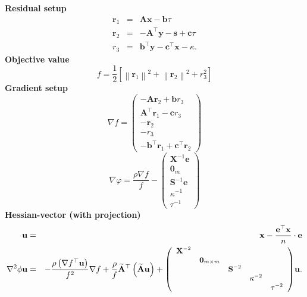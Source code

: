 \documentclass{article}
\newcommand{\cdummy}{\cdot}
\newcommand{\tmstrong}[1]{\textbf{#1}}
\newcommand{\x}{\mathbf{x}}
\newcommand{\A}{\mathbf{A}}
\newcommand{\0}{\textbf{0}}
\newcommand{\e}{\mathbf{e}}
\newcommand{\n}{\nabla}
\newcommand{\X}{\mathbf{X}}
\newcommand{\tmb}{\mathbf{b}}
\newcommand{\tmc}{\mathbf{c}}
\newcommand{\y}{\mathbf{y}}
\newcommand{\s}{\mathbf{s}}
\newcommand{\tmu}{\mathbf{u}}
\newcommand{\bs}{\mathbf{S}}
\newcommand{\tmr}{\mathbf{r}}
\begin{document}
{\tmstrong{Residual setup}}
\begin{eqnarray*}
  \tmr_1 & = & \A \x - \tmb \tau\\
  \tmr_2 & = & - \A^{\top} \y - \s + \tmc \tau\\
  r_3 & = & \tmb^{\top} \y - \tmc^{\top} \x - \kappa .
\end{eqnarray*}
{\tmstrong{Objective value}}
\[ f = \frac{1}{2} \left[ \left\| \tmr_1 \right\|^2 + \left\| \tmr_2
   \right\|^2 + r_3^2 \right] \]
{\tmstrong{Gradient setup}}
\[ \nabla f = \left(\begin{array}{c}
     - \A \tmr_2 + \tmb r_3\\
     \A^{\top} \tmr_1 - \tmc r_3\\
     - \tmr_2\\
     - r_3\\
     - \tmb^{\top} \tmr_1 + \tmc^{\top} \tmr_2
   \end{array}\right) \]
\[ \nabla \varphi = \frac{\rho \n f}{f} - \left(\begin{array}{c}
     \X^{- 1} \e\\
     \0_m\\
     \bs^{- 1} \e\\
     \kappa^{- 1}\\
     \tau^{- 1}
   \end{array}\right) \]
{\tmstrong{Hessian-vector (with projection)}}
\begin{eqnarray*}
  \tmu & = & \x - \frac{\e^{\top} \x}{n} \cdummy \e\\
  \n^2 \phi \tmu & = & - \frac{\rho \left( \n f^{\top} \tmu \right)}{f^2} \n f
  + \frac{\rho}{f} \widetilde{\A}^{\top} \left( \widetilde{\A} \tmu \right) +
  \small{\left(\begin{array}{ccccc}
    \X^{- 2} &  &  &  & \\
    & \0_{m \times m} &  &  & \\
    &  & \bs^{- 2} &  & \\
    &  &  & \kappa^{- 2} & \\
    &  &  &  & \tau^{- 2}
  \end{array}\right)} \tmu .
\end{eqnarray*}
\end{document}
